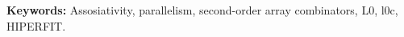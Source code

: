 \noindent\textbf{Keywords:} Assosiativity, parallelism, second-order array
combinators, L0, l0c, HIPERFIT.
